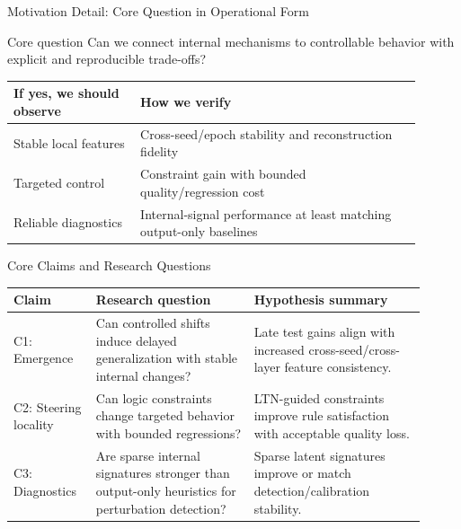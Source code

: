 \begin{frame}{Motivation Detail: Core Question in Operational Form}
    \small
    \begin{block}{Core question}
        Can we connect internal mechanisms to controllable behavior with explicit and reproducible trade-offs?
    \end{block}
    \vspace{0.4em}
    \begin{table}
        \centering
        \begin{tabular}{p{0.28\linewidth}p{0.62\linewidth}}
            \toprule
            \textbf{If yes, we should observe} & \textbf{How we verify} \\
            \midrule
            Stable local features & Cross-seed/epoch stability and reconstruction fidelity \\
            Targeted control & Constraint gain with bounded quality/regression cost \\
            Reliable diagnostics & Internal-signal performance at least matching output-only baselines \\
            \bottomrule
        \end{tabular}
    \end{table}
\end{frame}

\begin{frame}{Core Claims and Research Questions}
    \small
    \begin{table}
        \centering
        \begin{tabular}{p{0.18\linewidth}p{0.35\linewidth}p{0.38\linewidth}}
            \toprule
            \textbf{Claim} & \textbf{Research question} & \textbf{Hypothesis summary} \\
            \midrule
            C1: Emergence &
            Can controlled shifts induce delayed generalization with stable internal changes? &
            Late test gains align with increased cross-seed/cross-layer feature consistency. \\
            \addlinespace[0.3em]
            C2: Steering locality &
            Can logic constraints change targeted behavior with bounded regressions? &
            LTN-guided constraints improve rule satisfaction with acceptable quality loss. \\
            \addlinespace[0.3em]
            C3: Diagnostics &
            Are sparse internal signatures stronger than output-only heuristics for perturbation detection? &
            Sparse latent signatures improve or match detection/calibration stability. \\
            \bottomrule
        \end{tabular}
    \end{table}
\end{frame}

